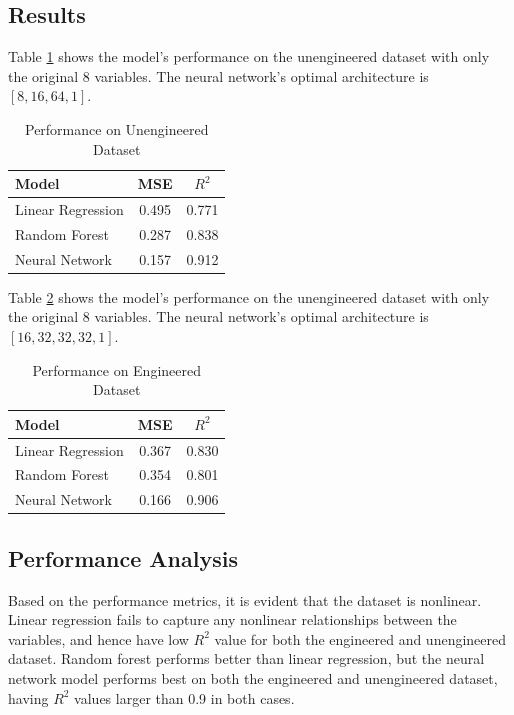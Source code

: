\documentclass[twocolumn]{article}
\begin{document}
\subsection{Results}
Table \ref{engineered_results} shows the model's performance on the unengineered dataset with only the original 8 variables. The neural network's optimal architecture is $[8,16,64,1]$.
\FloatBarrier
\begin{table}[h!]
    \centering
    \begin{tabular}{lcc}
        \toprule
        Model & MSE & $R^2$ \\
        \midrule
        Linear Regression & 0.495 & 0.771 \\
        Random Forest & 0.287 & 0.838 \\
        Neural Network & 0.157 & 0.912 \\
        \bottomrule
    \end{tabular}
    \caption{Performance on Unengineered Dataset}
    \label{engineered_results}
\end{table}
\FloatBarrier
Table \ref{results} shows the model's performance on the unengineered dataset with only the original 8 variables. The neural network's optimal architecture is $[16,32,32,32,1]$.

\begin{table}[h!]
    \centering
    \begin{tabular}{lcc}
        \toprule
        Model & MSE & $R^2$ \\
        \midrule
        Linear Regression & 0.367 & 0.830 \\
        Random Forest & 0.354 & 0.801 \\
        Neural Network & 0.166 & 0.906 \\
        \bottomrule
    \end{tabular}
    \caption{Performance on Engineered Dataset}
    \label{results}
\end{table}

\subsection{Performance Analysis}
Based on the performance metrics, it is evident that the dataset is nonlinear. Linear regression fails to capture any nonlinear relationships between the variables, and hence have low $R^2$ value for both the engineered and unengineered dataset. Random forest performs better than linear regression, but the neural network model performs best on both the engineered and unengineered dataset, having $R^2$ values larger than 0.9 in both cases.
\end{document}
